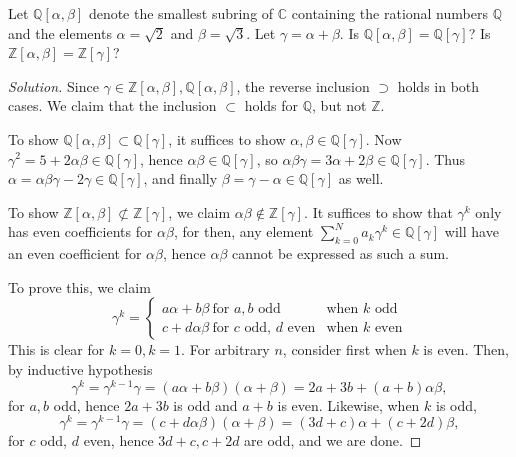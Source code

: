 \documentclass[12pt]{article}
\theoremstyle{remark}
\begin{document}
\begin{problem}\label{exc:11.1.3}
  Let $\mathbb{Q}[\alpha,\beta]$ denote the smallest subring of $\mathbb{C}$ containing the rational numbers $\mathbb{Q}$ and the elements $\alpha = \sqrt{2}$ and $\beta = \sqrt{3}$. Let $\gamma = \alpha + \beta$. Is $\mathbb{Q}[\alpha,\beta] = \mathbb{Q}[\gamma]$? Is $\mathbb{Z}[\alpha,\beta] = \mathbb{Z}[\gamma]$?
\end{problem}
\begin{proof}[Solution]
  Since $\gamma \in \mathbb{Z}[\alpha,\beta],\mathbb{Q}[\alpha,\beta]$, the reverse inclusion $\supset$ holds in both cases. We claim that the inclusion $\subset$ holds for $\mathbb{Q}$, but not $\mathbb{Z}$.
  \par To show $\mathbb{Q}[\alpha,\beta] \subset \mathbb{Q}[\gamma]$, it suffices to show $\alpha,\beta \in \mathbb{Q}[\gamma]$. Now $\gamma^2 = 5 + 2\alpha\beta \in \mathbb{Q}[\gamma]$, hence $\alpha\beta \in \mathbb{Q}[\gamma]$, so $\alpha\beta\gamma = 3\alpha + 2\beta \in \mathbb{Q}[\gamma]$. Thus $\alpha = \alpha\beta\gamma - 2\gamma \in \mathbb{Q}[\gamma]$, and finally $\beta = \gamma-\alpha \in \mathbb{Q}[\gamma]$ as well.
  \par To show $\mathbb{Z}[\alpha,\beta] \not\subset \mathbb{Z}[\gamma]$, we claim $\alpha\beta \notin \mathbb{Z}[\gamma]$. It suffices to show that $\gamma^k$ only has even coefficients for $\alpha\beta$, for then, any element $\sum_{k=0}^N a_k\gamma^k \in \mathbb{Q}[\gamma]$ will have an even coefficient for $\alpha\beta$, hence $\alpha\beta$ cannot be expressed as such a sum.
  \par To prove this, we claim 
  \begin{equation*}
    \gamma^k = \begin{cases}
      a\alpha + b\beta~\text{for $a,b$ odd} & \text{when $k$ odd}\\
      c + d\alpha\beta~\text{for $c$ odd, $d$ even} & \text{when $k$ even}
    \end{cases}
  \end{equation*}
  This is clear for $k=0,k=1$. For arbitrary $n$, consider first when $k$ is even. Then, by inductive hypothesis
  \begin{equation*}
    \gamma^k = \gamma^{k-1}\gamma = (a\alpha+b\beta)(\alpha + \beta) = 2a+3b + (a+b)\alpha\beta,
  \end{equation*}
  for $a,b$ odd, hence $2a+3b$ is odd and $a+b$ is even. Likewise, when $k$ is odd,
  \begin{equation*}
    \gamma^k = \gamma^{k-1}\gamma = (c+d\alpha\beta)(\alpha + \beta) = (3d+c)\alpha + (c+2d)\beta,
  \end{equation*}
  for $c$ odd, $d$ even, hence $3d+c,c+2d$ are odd, and we are done.
\end{proof}
\end{document}
